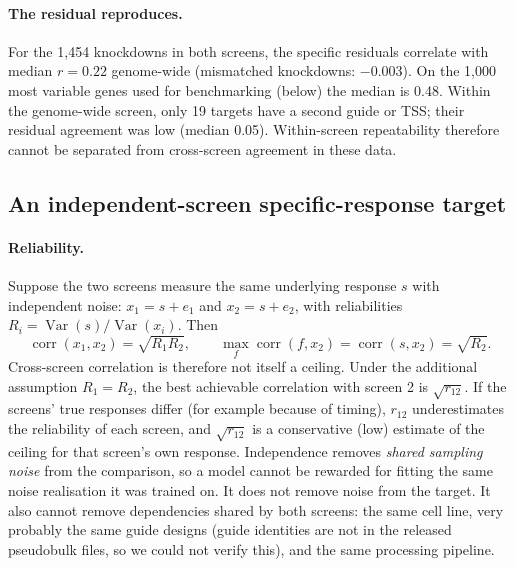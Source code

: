 \documentclass[10pt]{article}
\begin{document}
\begin{table}[t]
\centering\small
\caption{\textbf{Decomposition sensitivity.} Pooled quantities are sums over knockdowns divided by total (or signal) energy; ``median noise share'' is the per-knockdown median. ``Specific'' = residual energy minus its expected noise (can be biased by the noise-model error in Table~\ref{tab:noise}).}
\label{tab:decomp}
\resizebox{\textwidth}{!}{}
\end{table}

\begin{table}[t]
\centering\small
\caption{\textbf{Noise-model and axis checks across the two screens.}}
\label{tab:noise}

\end{table}

\paragraph{The residual reproduces.} For the 1{,}454 knockdowns in both screens, the specific residuals correlate with median $r=0.22$ genome-wide (mismatched knockdowns: $-0.003$). On the 1{,}000 most variable genes used for benchmarking (below) the median is 0.48. Within the genome-wide screen, only 19 targets have a second guide or TSS; their residual agreement was low (median 0.05). Within-screen repeatability therefore cannot be separated from cross-screen agreement in these data.

\subsection{An independent-screen specific-response target}
\label{sec:bench}
\paragraph{Reliability.} Suppose the two screens measure the same underlying response $s$ with independent noise: $x_1=s+e_1$ and $x_2=s+e_2$, with reliabilities $R_i=\operatorname{Var}(s)/\operatorname{Var}(x_i)$. Then
\[\operatorname{corr}(x_1,x_2)=\sqrt{R_1R_2},\qquad \max_f \operatorname{corr}(f,x_2)=\operatorname{corr}(s,x_2)=\sqrt{R_2}.\]
Cross-screen correlation is therefore not itself a ceiling. Under the additional assumption $R_1=R_2$, the best achievable correlation with screen 2 is $\sqrt{r_{12}}$.
If the screens' true responses differ (for example because of timing), $r_{12}$ underestimates the reliability of each screen, and $\sqrt{r_{12}}$ is a conservative (low) estimate of the ceiling for that screen's own response.
Independence removes \emph{shared sampling noise} from the comparison, so a model cannot be rewarded for fitting the same noise realisation it was trained on. It does not remove noise from the target. It also cannot remove dependencies shared by both screens: the same cell line, very probably the same guide designs (guide identities are not in the released pseudobulk files, so we could not verify this), and the same processing pipeline.
\end{document}
